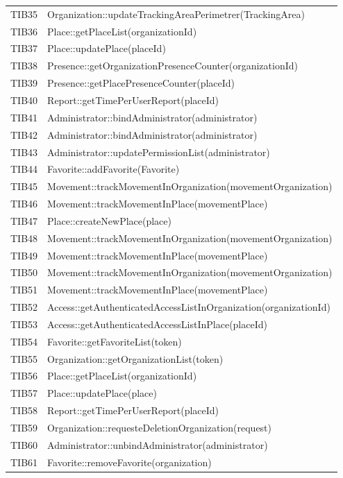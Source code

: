 {\begin{longtable}{C{2cm} C{12cm}}
	TIB35 & Organization::updateTrackingAreaPerimetrer(TrackingArea) \\
	TIB36 & Place::getPlaceList(organizationId) \\
	TIB37 & Place::updatePlace(placeId) \\
	TIB38 & Presence::getOrganizationPresenceCounter(organizationId) \\
	TIB39 & Presence::getPlacePresenceCounter(placeId) \\
	TIB40 & Report::getTimePerUserReport(placeId)\\
	TIB41 & Administrator::bindAdministrator(administrator) \\
	TIB42 & Administrator::bindAdministrator(administrator) \\
	TIB43 & Administrator::updatePermissionList(administrator) \\
	TIB44 & Favorite::addFavorite(Favorite) \\
	TIB45 & Movement::trackMovementInOrganization(movementOrganization) \\
	TIB46 & Movement::trackMovementInPlace(movementPlace) \\
	TIB47 & Place::createNewPlace(place)\\
	TIB48 & Movement::trackMovementInOrganization(movementOrganization) \\
	TIB49 & Movement::trackMovementInPlace(movementPlace) \\
	TIB50 & Movement::trackMovementInOrganization(movementOrganization) \\
	TIB51 & Movement::trackMovementInPlace(movementPlace) \\
	TIB52 & Access::getAuthenticatedAccessListInOrganization(organizationId) \\
	TIB53 & Access::getAuthenticatedAccessListInPlace(placeId) \\
	TIB54 & Favorite::getFavoriteList(token) \\
	TIB55 & Organization::getOrganizationList(token) \\
	TIB56 & Place::getPlaceList(organizationId) \\
	TIB57 & Place::updatePlace(place) \\
	TIB58 & Report::getTimePerUserReport(placeId) \\
	TIB59 & Organization::requesteDeletionOrganization(request) \\
	TIB60 & Administrator::unbindAdministrator(administrator) \\
	TIB61 & Favorite::removeFavorite(organization) \\

\end{longtable}}
